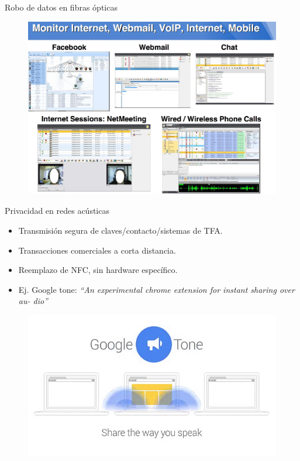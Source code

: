\documentclass[aspectratio=169]{beamer}
\begin{document}
\begin{frame}{Robo de datos en fibras ópticas}
\begin{figure}[t]
  \centering
  \includegraphics[width=0.75 \textwidth]{graphs/glimmer2.jpg} 
\end{figure}
\end{frame}


\begin{frame}{Privacidad en redes acústicas}

\begin{itemize}
 \item Transmisión segura de claves/contacto/sistemas de TFA.
 \item Transacciones comerciales a corta distancia.
 \item Reemplazo de NFC, sin hardware específico.
 \item Ej. Google tone: \textit{``An experimental chrome extension for instant sharing over au-
dio''}
 \end{itemize}
 
 \begin{figure}[t]
  \centering
  \includegraphics[width=0.65 \textwidth]{graphs/google_tone.jpg} 
\end{figure}
\end{frame}
\end{document}
